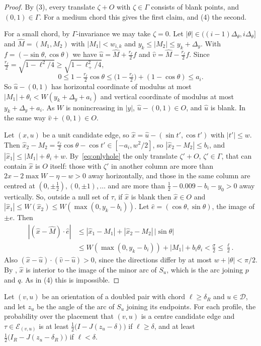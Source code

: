 \documentclass[11pt,colorlinks]{charlie}
\newcommand{\cD}{\mathcal{D}}
\begin{document}
\begin{proof}
By (3), every translate $\zeta+O$ with $\zeta\in\Gamma$ consists of blank points, and $(0,1)\in\Gamma$. For a medium chord this gives the first claim, and (4) the second.

For a small chord, by $\Gamma$-invariance we may take $\zeta=0$. Let $|\theta|\in((i-1)\Delta_\theta,i\Delta_\theta]$ and $\hat M=(M_1,M_2)$ with $|M_1|<w_{i,k}$ and $y_k\le|M_2|\le y_k+\Delta_y$. With $f=(-\sin\theta,\cos\theta)$ we have $\hat u=\hat M+\frac{r_\ell}2f$ and $\hat v=\hat M-\frac{r_\ell}2f$. Since $\frac{r_\ell}2=\sqrt{1-\ell^2/4}\ge\sqrt{1-\ell_+^2/4}$,
\[
 0\le1-\tfrac{r_\ell}2\cos\theta\le\big(1-\tfrac{r_\ell}2\big)+(1-\cos\theta)\le a_i .
\]
So $\hat u-(0,1)$ has horizontal coordinate of modulus at most $|M_1|+\theta_i<W(y_k+\Delta_y+a_i)$ and vertical coordinate of modulus at most $y_k+\Delta_y+a_i$. As $W$ is nonincreasing in $|y|$, $\hat u-(0,1)\in O$, and $\hat u$ is blank. In the same way $\hat v+(0,1)\in O$.

Let $(x,u)$ be a unit candidate edge, so $\hat x=\hat u-(\sin t',\cos t')$ with $|t'|\le w$. Then $\hat x_2-M_2=\frac{r_\ell}2\cos\theta-\cos t'\in[-a_i,w^2/2]$, so $|\hat x_2-M_2|\le b_i$, and $|\hat x_1|\le|M_1|+\theta_i+w$. By~\eqref{eq:onlyhole} the only translate $\zeta'+O$, $\zeta'\in\Gamma$, that can contain $\hat x$ is $O$ itself: those with $\zeta'$ in another column are more than $2x-2\max W-\eta-w>0$ away horizontally, and those in the same column are centred at $(0,\pm\frac12),(0,\pm1),\dots$ and are more than $\frac12-0.009-b_i-y_0>0$ away vertically. So, outside a null set of $\tau$, if $\hat x$ is blank then $\hat x\in O$ and $|\hat x_1|\le W(\hat x_2)\le W(\max(0,y_k-b_i))$. Let $\hat e=(\cos\theta,\sin\theta)$, the image of $\pm e$. Then
\begin{align*}
 |(\hat x-\hat M)\cdot\hat e|&\le|\hat x_1-M_1|+|\hat x_2-M_2|\,|\sin\theta|\\
 &\le W(\max(0,y_k-b_i))+|M_1|+b_i\theta_i<\frac\sigma2\le\frac\ell2 .
\end{align*}
Also $(\hat x-\hat u)\cdot(\hat v-\hat u)>0$, since the directions differ by at most $w+|\theta|<\pi/2$. By , $\hat x$ is interior to the image of the minor arc of $S_u$, which is the arc joining $p$ and $q$. As in (4) this is impossible.
\end{proof}

\begin{lemma}\label{lem:centre-prob}
Let $(v,u)$ be an orientation of a doubled pair with chord $\ell\ge\delta_R$ and $u\in\cD$, and let $z_u$ be the angle of the arc of $S_u$ joining its endpoints. For each profile, the probability over the placement that $(v,u)$ is a centre candidate edge and $\tau\in\mathcal E_{(v,u)}$ is at least $\frac12\big(I-J(z_u-\delta)\big)$ if $\ell\ge\delta$, and at least $\frac12\big(I_R-J(z_u-\delta_R)\big)$ if $\ell<\delta$.
\end{lemma}
\end{document}
